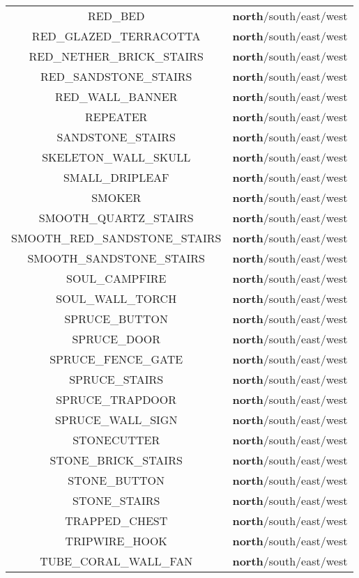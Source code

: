 \begin{longtable}{ |c|c| }
	RED\_BED & \textbf{north}/south/east/west \\
	RED\_GLAZED\_TERRACOTTA & \textbf{north}/south/east/west \\
	RED\_NETHER\_BRICK\_STAIRS & \textbf{north}/south/east/west \\
	RED\_SANDSTONE\_STAIRS & \textbf{north}/south/east/west \\
	RED\_WALL\_BANNER & \textbf{north}/south/east/west \\
	REPEATER & \textbf{north}/south/east/west \\
	SANDSTONE\_STAIRS & \textbf{north}/south/east/west \\
	SKELETON\_WALL\_SKULL & \textbf{north}/south/east/west \\
	SMALL\_DRIPLEAF & \textbf{north}/south/east/west \\
	SMOKER & \textbf{north}/south/east/west \\
	SMOOTH\_QUARTZ\_STAIRS & \textbf{north}/south/east/west \\
	SMOOTH\_RED\_SANDSTONE\_STAIRS & \textbf{north}/south/east/west \\
	SMOOTH\_SANDSTONE\_STAIRS & \textbf{north}/south/east/west \\
	SOUL\_CAMPFIRE & \textbf{north}/south/east/west \\
	SOUL\_WALL\_TORCH & \textbf{north}/south/east/west \\
	SPRUCE\_BUTTON & \textbf{north}/south/east/west \\
	SPRUCE\_DOOR & \textbf{north}/south/east/west \\
	SPRUCE\_FENCE\_GATE & \textbf{north}/south/east/west \\
	SPRUCE\_STAIRS & \textbf{north}/south/east/west \\
	SPRUCE\_TRAPDOOR & \textbf{north}/south/east/west \\
	SPRUCE\_WALL\_SIGN & \textbf{north}/south/east/west \\
	STONECUTTER & \textbf{north}/south/east/west \\
	STONE\_BRICK\_STAIRS & \textbf{north}/south/east/west \\
	STONE\_BUTTON & \textbf{north}/south/east/west \\
	STONE\_STAIRS & \textbf{north}/south/east/west \\
	TRAPPED\_CHEST & \textbf{north}/south/east/west \\
	TRIPWIRE\_HOOK & \textbf{north}/south/east/west \\
	TUBE\_CORAL\_WALL\_FAN & \textbf{north}/south/east/west \\

\end{longtable}

